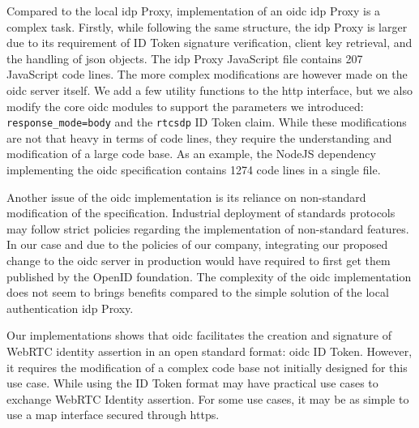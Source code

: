 Compared to the local \gls{idp} Proxy, implementation of an \gls{oidc} \gls{idp} Proxy is a complex task.
Firstly, while following the same structure, the \gls{idp} Proxy is larger due to its requirement of ID Token signature verification, client key retrieval, and the handling of \gls{json} objects.
The \gls{idp} Proxy JavaScript file contains 207 JavaScript code lines.
The more complex modifications are however made on the \gls{oidc} server itself.
We add a few utility functions to the \gls{http} interface, but we also modify the core \gls{oidc} modules to support the parameters we introduced: \texttt{response\_mode=body} and the \texttt{rtcsdp} ID Token claim.
While these modifications are not that heavy in terms of code lines, they require the understanding and modification of a large code base.
As an example, the NodeJS dependency implementing the \gls{oidc} specification contains 1274 code lines in a single file.

Another issue of the \gls{oidc} implementation is its reliance on non-standard modification of the specification.
Industrial deployment of standards protocols may follow strict policies regarding the implementation of non-standard features.
In our case and due to the policies of our company, integrating our proposed change to the \gls{oidc} server in production would have required to first get them published by the OpenID foundation. 
The complexity of the \gls{oidc} implementation does not seem to brings benefits compared to the simple solution of the local authentication \gls{idp} Proxy.

Our implementations shows that \gls{oidc} facilitates the creation and signature of WebRTC identity assertion in an open standard format: \gls{oidc} ID Token.
However, it requires the modification of a complex code base not initially designed for this use case.
While using the ID Token format may have practical use cases to exchange WebRTC Identity assertion.
For some use cases, it may be as simple to use a map interface secured through \gls{https}.

